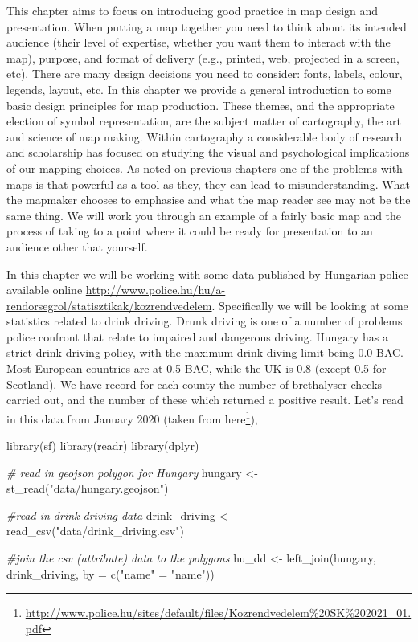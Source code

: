 \documentclass[
  krantz2]{krantz}
\makeatletter
\newenvironment{Shaded}{\begin{snugshade}}{\end{snugshade}}
\newcommand{\AttributeTok}[1]{\textcolor[rgb]{0.61,0.61,0.61}{#1}}
\newcommand{\CommentTok}[1]{\textcolor[rgb]{0.37,0.37,0.37}{\textit{#1}}}
\newcommand{\FunctionTok}[1]{\textcolor[rgb]{0,0,0}{#1}}
\newcommand{\NormalTok}[1]{#1}
\newcommand{\OtherTok}[1]{\textcolor[rgb]{0.37,0.37,0.37}{#1}}
\newcommand{\StringTok}[1]{\textcolor[rgb]{0.5,0.5,0.5}{#1}}
\renewcommand{\href}[2]{#2\footnote{\url{#1}}}
\newenvironment{kframe}{%
\medskip{}
\setlength{\fboxsep}{.8em}
 \def\at@end@of@kframe{}%
 \ifinner\ifhmode%
  \def\at@end@of@kframe{\end{minipage}}%
  \begin{minipage}{\columnwidth}%
 \fi\fi%
 \def\FrameCommand##1{\hskip\@totalleftmargin \hskip-\fboxsep
 \colorbox{shadecolor}{##1}\hskip-\fboxsep
     \hskip-\linewidth \hskip-\@totalleftmargin \hskip\columnwidth}%
 \MakeFramed {\advance\hsize-\width
   \@totalleftmargin\z@ \linewidth\hsize
   \@setminipage}}%
 {\par\unskip\endMakeFramed%
 \at@end@of@kframe}
\renewenvironment{Shaded}{\begin{kframe}}{\end{kframe}}
\makeatother
\begin{document}
This chapter aims to focus on introducing good practice in map design and presentation. When putting a map together you need to think about its intended audience (their level of expertise, whether you want them to interact with the map), purpose, and format of delivery (e.g., printed, web, projected in a screen, etc). There are many design decisions you need to consider: fonts, labels, colour, legends, layout, etc. In this chapter we provide a general introduction to some basic design principles for map production. These themes, and the appropriate election of symbol representation, are the subject matter of cartography, the art and science of map making. Within cartography a considerable body of research and scholarship has focused on studying the visual and psychological implications of our mapping choices. As noted on previous chapters one of the problems with maps is that powerful as a tool as they, they can lead to misunderstanding. What the mapmaker chooses to emphasise and what the map reader see may not be the same thing. We will work you through an example of a fairly basic map and the process of taking to a point where it could be ready for presentation to an audience other that yourself.

In this chapter we will be working with some data published by Hungarian police available online \url{http://www.police.hu/hu/a-rendorsegrol/statisztikak/kozrendvedelem}. Specifically we will be looking at some statistics related to drink driving. Drunk driving is one of a number of problems police confront that relate to impaired and dangerous driving. Hungary has a strict drink driving policy, with the maximum drink diving limit being 0.0 BAC. Most European countries are at 0.5 BAC, while the UK is 0.8 (except 0.5 for Scotland). We have record for each county the number of brethalyser checks carried out, and the number of these which returned a positive result. Let's read in this data from January 2020 (taken from \href{http://www.police.hu/sites/default/files/Kozrendvedelem\%20SK\%202021_01.pdf}{here}),

\begin{Shaded}
\begin{Highlighting}[]
\FunctionTok{library}\NormalTok{(sf)}
\FunctionTok{library}\NormalTok{(readr)}
\FunctionTok{library}\NormalTok{(dplyr)}


\CommentTok{\# read in geojson polygon for Hungary}
\NormalTok{hungary }\OtherTok{\textless{}{-}} \FunctionTok{st\_read}\NormalTok{(}\StringTok{"data/hungary.geojson"}\NormalTok{)}

\CommentTok{\#read in drink driving data }
\NormalTok{drink\_driving }\OtherTok{\textless{}{-}} \FunctionTok{read\_csv}\NormalTok{(}\StringTok{"data/drink\_driving.csv"}\NormalTok{)}

\CommentTok{\#join the csv (attribute) data to the polygons}
\NormalTok{hu\_dd }\OtherTok{\textless{}{-}} \FunctionTok{left\_join}\NormalTok{(hungary, drink\_driving, }\AttributeTok{by =} \FunctionTok{c}\NormalTok{(}\StringTok{"name"} \OtherTok{=} \StringTok{"name"}\NormalTok{))}
\end{Highlighting}
\end{Shaded}
\end{document}

